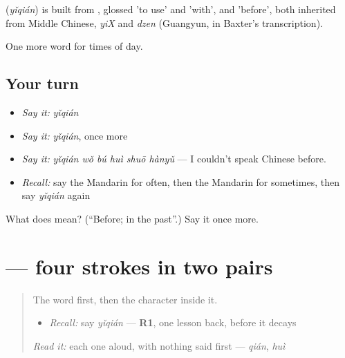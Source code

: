 \begin{cousinweb}
\textbf{} (\emph{yǐqián}) is built from , glossed 'to use' and 'with', and  'before', both inherited from Middle Chinese, \emph{yiX} and \emph{dzen} (Guangyun, in Baxter's transcription).
\end{cousinweb}

\begin{grammarlens}[title={What you've built}]
One more word for times of day.
\end{grammarlens}

\subsection*{Your turn}
\begin{itemize}
\raggedright
  \item \emph{Say it:} \emph{yǐqián}
  \item \emph{Say it:} \emph{yǐqián}, once more
  \item \emph{Say it:} \emph{yǐqián wǒ bú huì shuō hànyǔ} — I couldn't speak Chinese before.
  \item \emph{Recall:} say the Mandarin for often, then the Mandarin for sometimes, then say \emph{yǐqián} again
\end{itemize}

\begin{tcolorbox}[breakable,colback=teal!4,colframe=teal!35!black,title={Before you move on}]
What does  mean? (\textquotedblleft{}Before; in the past\textquotedblright{}.) Say it once more.
\end{tcolorbox}
\section[\texorpdfstring{\zh{以} (yǐ)}{以 (yǐ)}]{ — four strokes in two pairs}

\label{lesson:ZH-W126-yi-use}



\begin{quote}
The word first, then the character inside it.

\begin{itemize}
\raggedright
  \item \emph{Recall:} say \emph{yǐqián} — \textbf{R1}, one lesson back, before it decays
\end{itemize}

\begin{quote}
 
\end{quote}

\emph{Read it:} each one aloud, with nothing said first — \emph{qián}, \emph{huì}
\end{quote}

